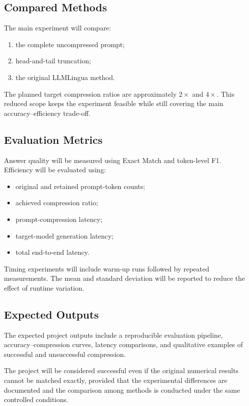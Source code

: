 \documentclass[10pt,a4paper,twocolumn]{article}
\begin{document}
\subsection{Compared Methods}

The main experiment will compare:

\begin{enumerate}
    \item the complete uncompressed prompt;
    \item head-and-tail truncation;
    \item the original LLMLingua method.
\end{enumerate}

The planned target compression ratios are approximately $2\times$ and $4\times$. This reduced scope keeps the experiment feasible while still covering the main accuracy--efficiency trade-off.

\subsection{Evaluation Metrics}

Answer quality will be measured using Exact Match and token-level F1. Efficiency will be evaluated using:

\begin{itemize}
    \item original and retained prompt-token counts;
    \item achieved compression ratio;
    \item prompt-compression latency;
    \item target-model generation latency;
    \item total end-to-end latency.
\end{itemize}

Timing experiments will include warm-up runs followed by repeated measurements. The mean and standard deviation will be reported to reduce the effect of runtime variation.

\subsection{Expected Outputs}

The expected project outputs include a reproducible evaluation pipeline, accuracy--compression curves, latency comparisons, and qualitative examples of successful and unsuccessful compression.

The project will be considered successful even if the original numerical results cannot be matched exactly, provided that the experimental differences are documented and the comparison among methods is conducted under the same controlled conditions.
\end{document}
